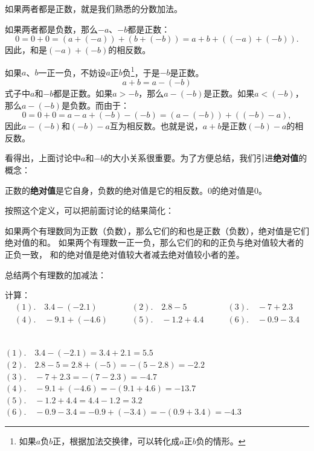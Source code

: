 \documentclass[12pt,UTF8,fontset=none]{ctexbook}
\begin{document}
如果两者都是正数，就是我们熟悉的分数加法。

如果两者都是负数，那么$-a$、$-b$都是正数：
$$ 0 = 0 + 0 = (a +(-a)) + (b + (-b)) = a + b + \left((-a) + (-b)\right).$$
因此，和是$(-a) + (-b)$的相反数。

如果$a$、$b$一正一负，不妨设$a$正$b$负\footnote{如果$a$负$b$正，根据加法交换律，可以转化成$a$正$b$负的情形。}，于是$-b$是正数。
$$ a + b = a - (-b)$$
式子中$a$和$-b$都是正数。如果$a > -b$，那么$a - (-b)$是正数。如果$a < (-b)$，那么$a - (-b)$是负数。而由于：
$$ 0 = 0 + 0 = a - a + (-b) - (-b) = \left(a - (-b)\right) + \left((-b) - a\right),$$
因此$a - (-b)$和$(-b) - a$互为相反数。也就是说，$a + b$是正数$(-b) - a$的相反数。

看得出，上面讨论中$a$和$-b$的大小关系很重要。为了方便总结，我们引进\textbf{绝对值}的概念：
\begin{df}\label{df:3-0-0}
    正数的\textbf{绝对值}是它自身，负数的绝对值是它的相反数。$0$的绝对值是$0$。
\end{df}
按照这个定义，可以把前面讨论的结果简化：

如果两个有理数同为正数（负数），那么它们的和也是正数（负数），绝对值是它们绝对值的和。
如果两个有理数一正一负，那么它们的和的正负与绝对值较大者的正负一致，
和的绝对值是绝对值较大者减去绝对值较小者的差。

总结两个有理数的加减法：
\begin{center}
\end{center}

\begin{ex}
    计算：
    $$
    \begin{array}{lll}
        (1). \quad 3.4 - (-2.1) \quad & \quad (2). \quad 2.8 - 5 \quad & \quad (3). \quad -7 + 2.3 \\
        (4). \quad -9.1 + (-4.6) \quad & \quad (5). \quad -1.2 + 4.4 \quad & \quad (6). \quad -0.9 - 3.4
    \end{array}
    $$
\end{ex}
\begin{so}
    \mbox{}\\
    \indent $(1). \quad 3.4 - (-2.1) = 3.4 + 2.1 = 5.5$ \\
    \indent $(2). \quad 2.8 - 5 = 2.8 + (-5) = -(5 - 2.8) = -2.2$ \\
    \indent $(3). \quad -7 + 2.3 = -(7 - 2.3) = -4.7$ \\
    \indent $(4). \quad -9.1 + (-4.6) = -(9.1 + 4.6) = -13.7$ \\
    \indent $(5). \quad -1.2 + 4.4 = 4.4 - 1.2 = 3.2$ \\
    \indent $(6). \quad -0.9 - 3.4 = -0.9 + (-3.4) = -(0.9 + 3.4) = -4.3 $ 
\end{so}
\end{document}
